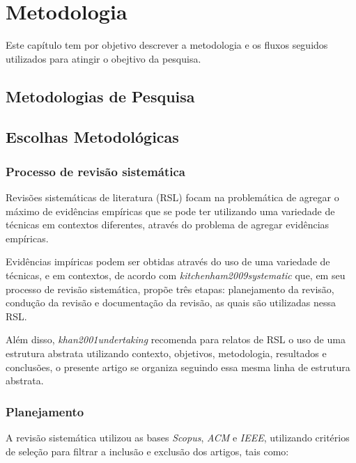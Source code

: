 \chapter[Metodologia]{Metodologia}

Este capítulo tem por objetivo descrever a metodologia e os fluxos seguidos utilizados para atingir o obejtivo da pesquisa. 


\section{Metodologias de Pesquisa}



\section{Escolhas Metodológicas}


\subsection{Processo de revisão sistemática}

Revisões sistemáticas de literatura (RSL) focam na problemática de agregar o máximo de evidências empíricas que se pode ter utilizando uma variedade de técnicas em contextos diferentes, através do problema de agregar evidências empíricas.

Evidências impíricas podem ser obtidas através do uso de uma variedade de técnicas, e em contextos, de acordo com \textit{kitchenham2009systematic} que, em seu processo de revisão sistemática, propõe três etapas: planejamento da revisão, condução da revisão e documentação da revisão, as quais são utilizadas nessa RSL. 

\par Além disso, \textit{khan2001undertaking} recomenda para relatos de RSL o uso de uma estrutura abstrata utilizando contexto, objetivos, metodologia, resultados e conclusões, o presente artigo se organiza seguindo essa mesma linha de estrutura abstrata.

\subsection{Planejamento}
\par A revisão sistemática utilizou as bases \textit{Scopus}, \textit{ACM} e \textit{IEEE}, utilizando critérios de seleção para filtrar a inclusão e exclusão dos artigos, tais como:


